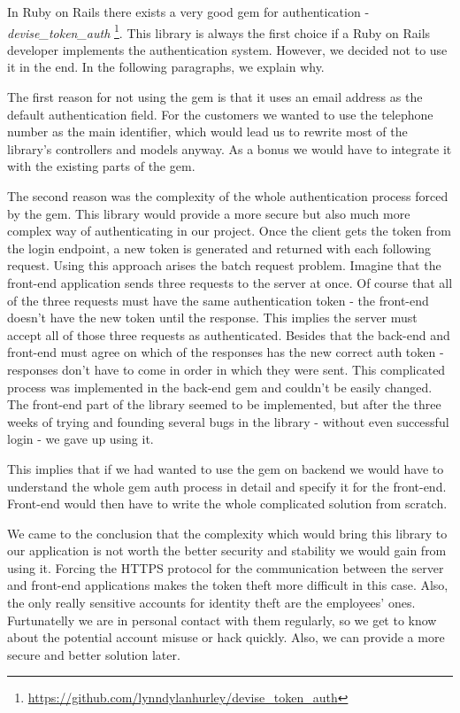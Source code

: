 In Ruby on Rails there exists a very good gem for authentication - \textit{devise\_token\_auth} \footnote{\url{https://github.com/lynndylanhurley/devise\_token\_auth}}. This library is always the first choice if a Ruby on Rails developer implements the authentication system. However, we decided not to use it in the end. In the following paragraphs, we explain why.

The first reason for not using the gem is that it uses an email address as the default authentication field. For the customers we wanted to use the telephone number as the main identifier, which would lead us to rewrite most of the library's controllers and models anyway. As a bonus we would have to integrate it with the existing parts of the gem.

The second reason was the complexity of the whole authentication process forced by the gem. This library would provide a more secure but also much more complex way of authenticating in our project. Once the client gets the token from the login endpoint, a new token is generated and returned with each following request. Using this approach arises the batch request problem. Imagine that the front-end application sends three requests to the server at once. Of course that all of the three requests must have the same authentication token - the front-end doesn't have the new token until the response. This implies the server must accept all of those three requests as authenticated. Besides that the back-end and front-end must agree on which of the responses has the new correct auth token - responses don't have to come in order in which they were sent. This complicated process was implemented in the back-end gem and couldn't be easily changed. The front-end part of the library seemed to be implemented, but after the three weeks of trying and founding several bugs in the library - without even successful login - we gave up using it.

This implies that if we had wanted to use the gem on backend we would have to understand the whole gem auth process in detail and specify it for the front-end. Front-end would then have to write the whole complicated solution from scratch. 

We came to the conclusion that the complexity which would bring this library to our application is not worth the better security and stability we would gain from using it. Forcing the HTTPS protocol for the communication between the server and front-end applications makes the token theft more difficult in this case. Also, the only really sensitive accounts for identity theft are the employees' ones. Furtunatelly we are in personal contact with them regularly, so we get to know about the potential account misuse or hack quickly. Also, we can provide a more secure and better solution later.


